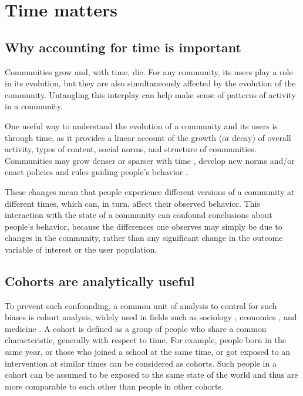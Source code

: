 \section{Time matters} 
\subsection{Why accounting for time is important}

Communities grow and, with time, die. For any community, its users play a role in its evolution, but they are also simultaneously affected by the evolution of the community. Untangling this interplay can help make sense of patterns of activity in a community.



One useful way to understand the evolution of a community and its users is through time, as it provides a linear account of the growth (or decay) of overall activity, types of content, social norms, and structure of communities. Communities may grow denser or sparser with time \cite{Leskovec2005}, develop new norms \cite{Kooti2010} and/or enact policies and rules guiding people's behavior \cite{Butler2008}.

These changes mean that people experience different versions of a community at different times, which can, in turn, affect their observed behavior. This interaction with the state of a community can confound conclusions about people's behavior, because the differences one observes may simply be due to changes in the community, rather than any significant change in the outcome variable of interest or the user population.  

\subsection{Cohorts are analytically useful}

To prevent such confounding, a common unit of analysis to control for such biases is cohort analysis, widely used in fields such as sociology \cite{Mason2012,Glenn2005}, economics \cite{Attanasio1993,Beldona2005}, and medicine \cite{Howartz1996,Davis2010}. A cohort is defined as a group of people who share a common characteristic, generally with respect to time. For example, people born in the same year, or those who joined a school at the same time, or got exposed to an intervention at similar times can be considered as cohorts. Such people in a cohort can be assumed to be exposed to the same state of the world and thus are more comparable to each other than people in other cohorts. 

